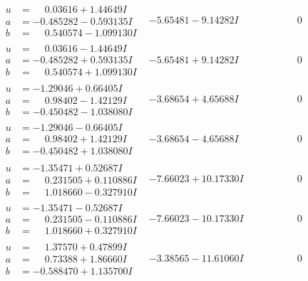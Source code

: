 \documentclass[1p]{elsarticle_modified}
\theoremstyle{definition}
\begin{document}
$$\begin{array}{c|c|c}
\begin{aligned}
u &= \phantom{-}0.03616 + 1.44649 I \\
a &= -0.485282 - 0.593135 I \\
b &= \phantom{-}0.540574 - 1.099130 I\end{aligned}
 & -5.65481 - 9.14282 I & \phantom{-0.000000 } 0 \\ \hline\begin{aligned}
u &= \phantom{-}0.03616 - 1.44649 I \\
a &= -0.485282 + 0.593135 I \\
b &= \phantom{-}0.540574 + 1.099130 I\end{aligned}
 & -5.65481 + 9.14282 I & \phantom{-0.000000 } 0 \\ \hline\begin{aligned}
u &= -1.29046 + 0.66405 I \\
a &= \phantom{-}0.98402 - 1.42129 I \\
b &= -0.450482 - 1.038080 I\end{aligned}
 & -3.68654 + 4.65688 I & \phantom{-0.000000 } 0 \\ \hline\begin{aligned}
u &= -1.29046 - 0.66405 I \\
a &= \phantom{-}0.98402 + 1.42129 I \\
b &= -0.450482 + 1.038080 I\end{aligned}
 & -3.68654 - 4.65688 I & \phantom{-0.000000 } 0 \\ \hline\begin{aligned}
u &= -1.35471 + 0.52687 I \\
a &= \phantom{-}0.231505 + 0.110886 I \\
b &= \phantom{-}1.018660 - 0.327910 I\end{aligned}
 & -7.66023 + 10.17330 I & \phantom{-0.000000 } 0 \\ \hline\begin{aligned}
u &= -1.35471 - 0.52687 I \\
a &= \phantom{-}0.231505 - 0.110886 I \\
b &= \phantom{-}1.018660 + 0.327910 I\end{aligned}
 & -7.66023 - 10.17330 I & \phantom{-0.000000 } 0 \\ \hline\begin{aligned}
u &= \phantom{-}1.37570 + 0.47899 I \\
a &= \phantom{-}0.73388 + 1.86660 I \\
b &= -0.588470 + 1.135700 I\end{aligned}
 & -3.38565 - 11.61060 I & \phantom{-0.000000 } 0 \\ \hline\begin{aligned}

\end{aligned}
\end{array}$$
\end{document}
